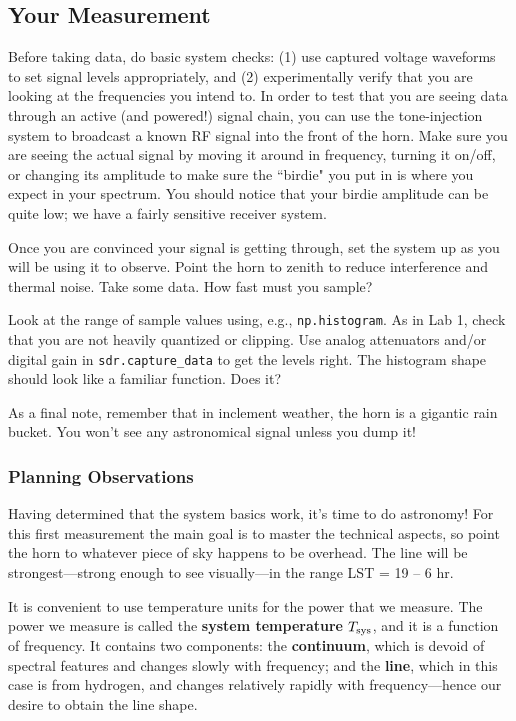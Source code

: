 \documentclass[11pt,preprint]{aastex}
\begin{document}
\subsection{Your Measurement}

\noindent
Before taking data, do basic system
checks: (1) use captured voltage waveforms to
set signal levels appropriately, and (2) experimentally
verify that you are looking at the frequencies you intend to. In order
to test that you are seeing data through an active (and powered!) signal
chain, you can use the tone-injection system to broadcast a known
RF signal into the front of the horn. 
Make sure you are seeing the actual signal by moving
it around in frequency, turning it on/off, or changing its amplitude
to make sure the ``birdie" you put in is where you expect in
your spectrum.  You should notice that your birdie amplitude can be quite low;
we have a fairly sensitive receiver system.

Once you are convinced your signal is getting through,
set the system up as you will be using it to observe. Point the
 horn to zenith to reduce interference and thermal noise.  Take some
data.  How fast must you sample? 

Look at the range of sample values using, e.g.,
  {\tt np.histogram}.  As in Lab 1, check that you are not heavily 
quantized or clipping.  Use analog attenuators and/or 
digital gain in {\tt sdr.capture\_data} to get the levels right.
  The histogram shape should look like a familiar function. Does it?

As a final note, remember that in inclement weather, the horn is a gigantic rain bucket. 
You won't see any astronomical signal unless you dump it!

\subsubsection{Planning Observations}

\noindent
Having determined that the system basics work, it's time to do
astronomy! For this first measurement the main goal is to master the
technical aspects, so point the horn to whatever piece of sky happens to be overhead.
The line will be strongest---strong enough
to see visually---in the range LST = 19 -- 6 hr.

It is convenient to use temperature units for the power
that we measure. The power we measure is called the
{\bf system temperature} $T_{\rm sys}$, and it is a function of frequency.
It contains two components:
the {\bf continuum}, which is devoid of spectral features
and changes slowly with frequency; and the {\bf line}, which in this
case is from hydrogen, and changes relatively rapidly with frequency---hence our
desire to obtain the line shape.
\end{document}
